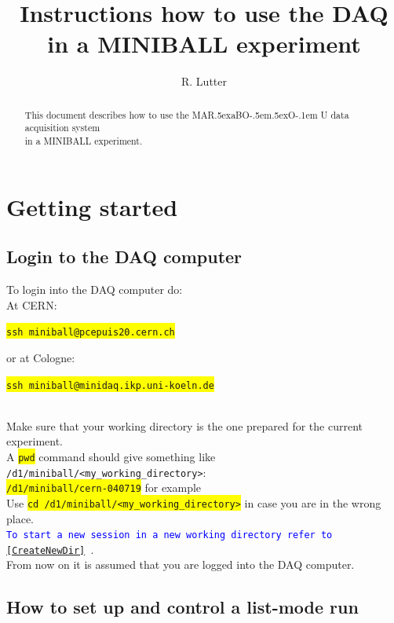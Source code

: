 \documentclass[10pt]{article}
\def\MARaBOU{MAR\lower.5ex\hbox{a}BO\kern-.5em\lower.5ex\hbox{O}\kern-.1em U}%
\newcommand{\yellow}[1]{\colorbox{yellow}{\texttt{#1}}}
\newcommand{\bluet}[1]{\textcolor{blue}{\texttt{#1}}}
\begin{document}
\begin{titlepage}
\title{Instructions how to use the DAQ in a MINIBALL experiment}
\author{R. Lutter}
\maketitle
\vfill
\begin{abstract}
\setlength{\parindent}{0pt}
\begin{center}
This document describes how to use the \MARaBOU{} data acquisition system\\
in a \mbox{MINIBALL} experiment.
\end{center}
\end{abstract}
\vfill
\end{titlepage}
\newpage
\tableofcontents
\newpage
\section{Getting started}\label{GettingStarted}
\subsection{Login to the DAQ computer}\vspace{3mm}

To login into the DAQ computer do:\vspace{4mm}\\
At CERN:
\centerline{\yellow{ssh miniball@pcepuis20.cern.ch}}
or at Cologne:
\centerline{\yellow{ssh miniball@minidaq.ikp.uni-koeln.de}}\\

Make sure that your working directory is the one prepared for the current experiment.\\
A \yellow{pwd} command should give something like \texttt{/d1/miniball/<my\_working\_directory>}:\\
\hspace*{.2\linewidth}\yellow{/d1/miniball/cern-040719} for example\\

Use \yellow{cd /d1/miniball/<my\_working\_directory>} in case you are in the wrong place.\\
\bluet{To start a new session in a new working directory refer to \ref{CreateNewDir} }.\\

From now on it is assumed that you are logged into the DAQ computer. 

\subsection{How to set up and control a list-mode run}\label{SetupListmodeRun}\vspace{3mm}
\end{document}
